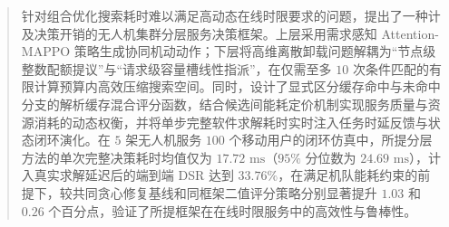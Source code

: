 \begin{abstract}
针对组合优化搜索耗时难以满足高动态在线时限要求的问题，提出了一种计及决策开销的无人机集群分层服务决策框架。上层采用需求感知 Attention-MAPPO 策略生成协同机动动作；下层将高维离散卸载问题解耦为“节点级整数配额提议”与“请求级容量槽线性指派”，在仅需至多 $10$ 次条件匹配的有限计算预算内高效压缩搜索空间。同时，设计了显式区分缓存命中与未命中分支的解析缓存混合评分函数，结合候选间能耗定价机制实现服务质量与资源消耗的动态权衡，并将单步完整软件求解耗时实时注入任务时延反馈与状态闭环演化。在 $5$ 架无人机服务 $100$ 个移动用户的闭环仿真中，所提分层方法的单次完整决策耗时均值仅为 $17.72\text{ ms}$（$95\%$ 分位数为 $24.69\text{ ms}$），计入真实求解延迟后的端到端 DSR 达到 $33.76\%$，在满足机队能耗约束的前提下，较共同贪心修复基线和同框架二值评分策略分别显著提升 $1.03$ 和 $0.26$ 个百分点，验证了所提框架在在线时限服务中的高效性与鲁棒性。
\end{abstract}

